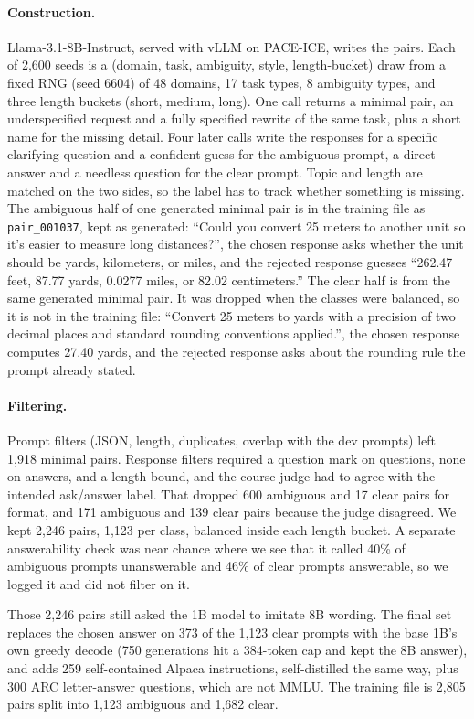 \documentclass[11pt]{article}
\begin{document}
\paragraph{Construction.}
Llama-3.1-8B-Instruct, served with vLLM on PACE-ICE, writes the pairs.
Each of 2,600 seeds is a (domain, task, ambiguity, style, length-bucket) draw from a fixed RNG (seed 6604) of 48 domains, 17 task types, 8 ambiguity types, and three length buckets (short, medium, long).
One call returns a minimal pair, an underspecified request and a fully specified rewrite of the same task, plus a short name for the missing detail.
Four later calls write the responses for a specific clarifying question and a confident guess for the ambiguous prompt, a direct answer and a needless question for the clear prompt.
Topic and length are matched on the two sides, so the label has to track whether something is missing.
The ambiguous half of one generated minimal pair is in the training file as \texttt{pair\_001037}, kept as generated: ``Could you convert 25 meters to another unit so it's easier to measure long distances?'', the chosen response asks whether the unit should be yards, kilometers, or miles, and the rejected response guesses ``262.47 feet, 87.77 yards, 0.0277 miles, or 82.02 centimeters.''
The clear half is from the same generated minimal pair. It was dropped when the classes were balanced, so it is not in the training file: ``Convert 25 meters to yards with a precision of two decimal places and standard rounding conventions applied.'', the chosen response computes 27.40 yards, and the rejected response asks about the rounding rule the prompt already stated.

\paragraph{Filtering.}
Prompt filters (JSON, length, duplicates, overlap with the dev prompts) left 1,918 minimal pairs.
Response filters required a question mark on questions, none on answers, and a length bound, and the course judge had to agree with the intended ask/answer label.
That dropped 600 ambiguous and 17 clear pairs for format, and 171 ambiguous and 139 clear pairs because the judge disagreed.
We kept 2,246 pairs, 1,123 per class, balanced inside each length bucket.
A separate answerability check was near chance where we see that it called 40\% of ambiguous prompts unanswerable and 46\% of clear prompts answerable, so we logged it and did not filter on it.

Those 2,246 pairs still asked the 1B model to imitate 8B wording.
The final set replaces the chosen answer on 373 of the 1,123 clear prompts with the base 1B's own greedy decode (750 generations hit a 384-token cap and kept the 8B answer), and adds 259 self-contained Alpaca instructions, self-distilled the same way, plus 300 ARC letter-answer questions, which are not MMLU.
The training file is 2,805 pairs split into 1,123 ambiguous and 1,682 clear.
\end{document}
